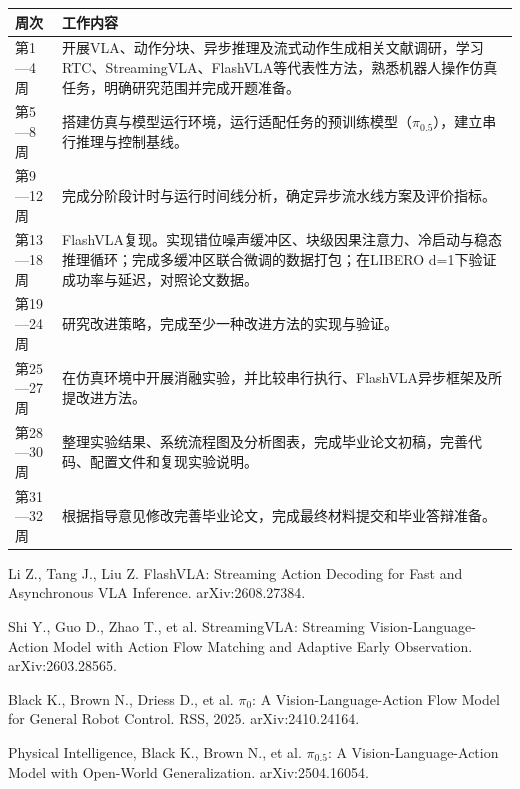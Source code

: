 \begin{center}
  \begin{tabularx}{\linewidth}{@{}lX@{}}
    \toprule
    \textbf{周次} & \textbf{工作内容} \\
    \midrule
    第1—4周   & 开展VLA、动作分块、异步推理及流式动作生成相关文献调研，学习RTC、StreamingVLA、FlashVLA等代表性方法，熟悉机器人操作仿真任务，明确研究范围并完成开题准备。 \\
    第5—8周   & 搭建仿真与模型运行环境，运行适配任务的预训练模型（\(\pi_{0.5}\)），建立串行推理与控制基线。 \\
    第9—12周  & 完成分阶段计时与运行时间线分析，确定异步流水线方案及评价指标。 \\
    第13—18周 & FlashVLA复现。实现错位噪声缓冲区、块级因果注意力、冷启动与稳态推理循环；完成多缓冲区联合微调的数据打包；在LIBERO d=1下验证成功率与延迟，对照论文数据。 \\
    第19—24周 & 研究改进策略，完成至少一种改进方法的实现与验证。 \\
    第25—27周 & 在仿真环境中开展消融实验，并比较串行执行、FlashVLA异步框架及所提改进方法。 \\
    第28—30周 & 整理实验结果、系统流程图及分析图表，完成毕业论文初稿，完善代码、配置文件和复现实验说明。 \\
    第31—32周 & 根据指导意见修改完善毕业论文，完成最终材料提交和毕业答辩准备。 \\
    \bottomrule
  \end{tabularx}
\end{center}


\newcommand{\tjproprev}[1]{{\tjfontbody\selectfont #1\par}}

\tjproprev{[1] Li Z., Tang J., Liu Z. FlashVLA: Streaming Action Decoding for Fast and Asynchronous VLA Inference. arXiv:2608.27384.}

\tjproprev{[2] Shi Y., Guo D., Zhao T., et al. StreamingVLA: Streaming Vision-Language-Action Model with Action Flow Matching and Adaptive Early Observation. arXiv:2603.28565.}

\tjproprev{[3] Black K., Brown N., Driess D., et al. \(\pi_0\): A Vision-Language-Action Flow Model for General Robot Control. RSS, 2025. arXiv:2410.24164.}

\tjproprev{[4] Physical Intelligence, Black K., Brown N., et al. \(\pi_{0.5}\): A Vision-Language-Action Model with Open-World Generalization. arXiv:2504.16054.}

